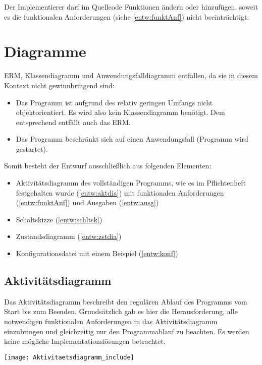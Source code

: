 \documentclass{scrartcl}
\begin{document}
	Der Implementierer darf im Quellcode Funktionen ändern oder hinzufügen, soweit es die funktionalen Anforderungen (siehe \autoref{entw:funktAnf}) nicht beeinträchtigt.
\newpage
\section{Diagramme}
ERM, Klassendiagramm und Anwendungsfalldiagramm entfallen, da sie in diesem Kontext nicht gewinnbringend sind: 
\begin{itemize}
\item Das Programm ist aufgrund des relativ geringen Umfangs nicht objektorientiert. Es wird also kein Klassendiagramm benötigt. Dem entsprechend entfällt auch das ERM.
\item Das Programm beschränkt sich auf einen Anwendungsfall (Programm wird gestartet).
\end{itemize}
Somit besteht der Entwurf ausschließlich aus folgenden Elementen:
\begin{itemize}
	\item Aktivitätsdiagramm des vollständigen Programms, wie es im Pflichtenheft festgehalten wurde (\autoref{entw:aktdia}) mit funktionalen Anforderungen (\autoref{entw:funktAnf}) und Ausgaben (\autoref{entw:ausg})
	\item Schaltskizze (\autoref{entw:schltsk})
	\item Zustandsdiagramm (\autoref{entw:zstdia})
	\item Konfigurationsdatei mit einem Beispiel (\autoref{entw:konf})
\end{itemize}	
\subsection{Aktivitätsdiagramm}
	Das Aktivitätsdiagramm beschreibt den regulären Ablauf des Programms vom Start bis zum Beenden. Grundsätzlich gab es hier die Herausforderung, alle notwendigen funktionalen Anforderungen in das Aktivitätsdiagramm einzubringen und gleichzeitig nur den Programmablauf zu beachten. Es werden keine mögliche Implementationslösungen betrachtet.\newpage
\label{entw:aktdia}
\begin{center}
\texttt{[image: Aktivitaetsdiagramm\_include]}
\end{center}

\newpage
\end{document}
